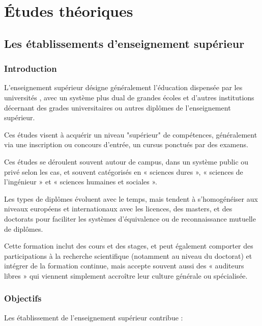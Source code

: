 \chapter{Études théoriques}
\minitoc
\newpage
\section{Les établissements d'enseignement supérieur}
\subsection{Introduction}
L'enseignement supérieur désigne généralement l'éducation dispensée par les universités \cite{etudeSup}, avec un système plus dual de grandes écoles et d'autres institutions décernant des grades universitaires ou autres diplômes de l'enseignement supérieur.
\medskip

Ces études visent à acquérir un niveau "supérieur" de compétences, généralement via une inscription ou concours d'entrée, un cursus ponctués par des examens. 
\medskip

Ces études se déroulent souvent autour de campus, dans un système public ou privé selon les cas, et souvent catégorisés en « sciences dures », « sciences de l'ingénieur » et « sciences humaines et sociales ».
\medskip

Les types de diplômes évoluent avec le temps, mais tendent à s'homogénéiser aux niveaux européens et internationaux avec les licences, des masters, et des doctorats pour faciliter les systèmes d'équivalence ou de reconnaissance mutuelle de diplômes.
\medskip

Cette formation inclut des cours et des stages, et peut également comporter des participations à la recherche scientifique (notamment au niveau du doctorat) et intégrer de la formation continue, mais accepte souvent aussi des « auditeurs libres » qui viennent simplement accroître leur culture générale ou spécialisée.

\subsection{Objectifs}
Les établissement de l'enseignement supérieur contribue : 
\medskip

